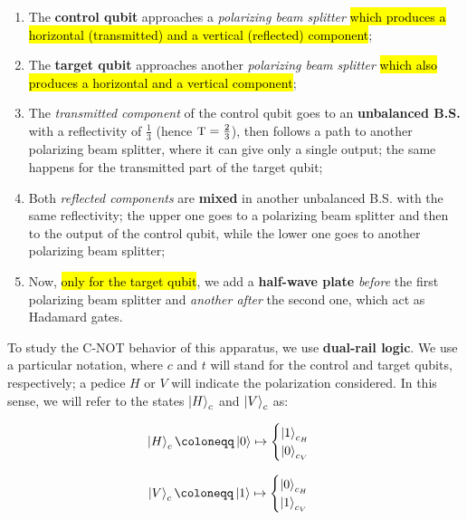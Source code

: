 \begin{enumerate}
\item The \textbf{control qubit} approaches a \emph{polarizing beam splitter} \hl{which produces a horizontal (transmitted) and a vertical (reflected) component};

\item The \textbf{target qubit} approaches another \emph{polarizing beam splitter} \hl{which also produces a horizontal and a vertical component};

\item The \emph{transmitted component} of the control qubit goes to an \textbf{unbalanced B.S.} with a reflectivity of $\frac{1}{3}$ (hence $\textsc{\small{T}}=\frac{2}{3}$), then follows a path to another polarizing beam splitter, where it can give only a single output; the same happens for the transmitted part of the target qubit;

\item Both \emph{reflected components} are \textbf{mixed} in another unbalanced B.S. with the same reflectivity; the upper one goes to a polarizing beam splitter and then to the output of the control qubit, while the lower one goes to another polarizing beam splitter;

\item Now, \hl{only for the target qubit}, we add a \textbf{half-wave plate} \emph{before} the first polarizing beam splitter and \emph{another after} the second one, which act as Hadamard gates.
\end{enumerate}

To study the C-NOT behavior of this apparatus, we use \textbf{dual-rail logic}. We use a particular notation, where $c$ and $t$ will stand for the control and target qubits, respectively; a pedice $H$ or $V$ will indicate the polarization considered. In this sense, we will refer to the states $\ket{H}_c$ and $\ket{V}_c$ as:

\begin{equation}
\ket{H}_c \coloneqq \ket{0} \mapsto  
\begin{cases}
    \ket{1}_{c_H}\\
    \ket{0}_{c_V}
\end{cases} 
\end{equation}

\begin{equation}
\ket{V}_c \coloneqq \ket{1} \mapsto  
\begin{cases}
    \ket{0}_{c_H}\\
    \ket{1}_{c_V}
\end{cases} 
\end{equation}

